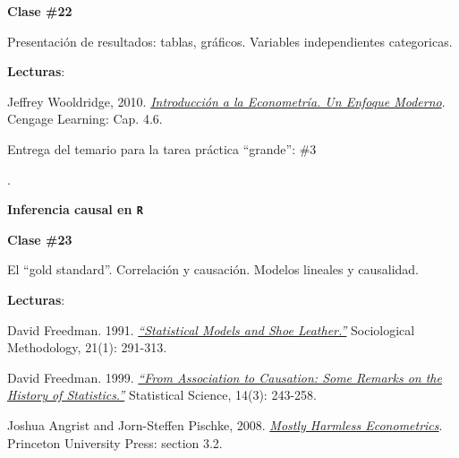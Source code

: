 \documentclass[letterpaper]{article}
\renewenvironment{itemize}{
  \begin{list}{}{
    \setlength{\leftmargin}{1.5em}
  }
}{
  \end{list}
}
\begin{document}
\begin{enumerate}
      \begin{itemize} 
        \item[$\bullet$] {\bf Clase \#22}
          \begin{itemize} 
            \item[$\circ$] Presentaci\'on de resultados: tablas, gr\'aficos. Variables independientes categoricas.
            \item[$\circ$] {\bf Lecturas}: 
              \begin{itemize}
                \item[$\diamond$] Jeffrey Wooldridge, 2010. \href{https://github.com/hbahamonde/Metodos_de_Investigacion/raw/master/Readings/Wooldridge.pdf}{\emph{Introducci\'on a la Econometr\'ia. Un Enfoque Moderno}}. Cengage Learning: Cap. 4.6.
              \end{itemize}
        {\color{orange}\item[$\bigstar$] Entrega del temario para la tarea pr\'actica ``grande'': \#3}.
          \end{itemize}
      \end{itemize}


  \item {\bf Inferencia causal en \texttt{R}}


      \begin{itemize} 
        \item[$\bullet$] {\bf Clase \#23}
          \begin{itemize} 
            \item[$\circ$] El ``gold standard''. Correlaci\'on y causaci\'on. Modelos lineales y causalidad.
            \item[$\circ$] {\bf Lecturas}: 
              \begin{itemize}
                \item[$\diamond$] David Freedman. 1991. \href{https://github.com/hbahamonde/Metodos_de_Investigacion/raw/master/Readings/Freedman1991.pdf}{\emph{``Statistical Models and Shoe Leather.''}} Sociological Methodology, 21(1): 291-313.
                \item[$\diamond$] David Freedman. 1999. \href{https://github.com/hbahamonde/Metodos_de_Investigacion/raw/master/Readings/Association_to_Causation.pdf}{\emph{``From Association to Causation: Some Remarks on the History of Statistics.''}} Statistical Science, 14(3): 243-258.
                \item[$\diamond$] Joshua Angrist and Jorn-Steffen Pischke, 2008. \href{https://github.com/hbahamonde/Metodos_de_Investigacion/raw/master/Readings/MHE.pdf}{\emph{Mostly Harmless Econometrics}}. Princeton University Press: section 3.2.
              \end{itemize}
          \end{itemize}
      \end{itemize}






\end{enumerate}
\end{document}
